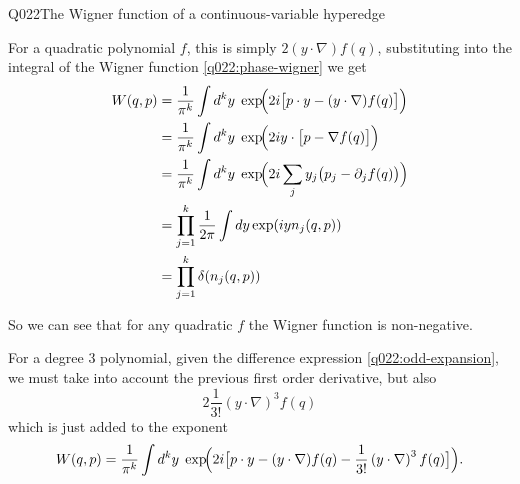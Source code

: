 \begin{entry}{Q022}{The Wigner function of a continuous-variable hyperedge}
\begin{solution}[Part (b)]
For a quadratic polynomial $f$, this is simply $2(y\cdot\nabla)f(q)$, substituting into the integral of the Wigner function \eqref{q022:phase-wigner} we get
\begin{equation}
\begin{split}
     W(q,p)&=\frac{1}{\pi^{k}}\int d^{k}y\;
          \exp\!\Bigl(2i\bigl[p\cdot y-(y\cdot\nabla)f(q)\bigr]\Bigr)\\
          &=\frac{1}{\pi^{k}}\int d^{k}y\;
          \exp\!\Bigl(2i y\cdot \bigl[p-\nabla f(q)\bigr]\Bigr)\\
          &=\frac{1}{\pi^{k}}\int d^{k}y\;
          \exp\!\Bigl(2i \sum_j y_j \bigl(p_j-\partial_j f(q)\bigr)\Bigr)\\
          &= \prod_{j=1}^{k} \frac{1}{2\pi} \int dy \exp(iy n_j(q,p))\\
          &= \prod_{j=1}^{k} \delta(n_j(q,p))
\end{split}
\label{q022:quadratic-wigner}
\end{equation}

So we can see that for any quadratic $f$ the Wigner function is non-negative.
\end{solution}

\begin{solution}[Part (c)]
For a degree $3$ polynomial, given the difference expression \eqref{q022:odd-expansion}, we must take into account the previous first order derivative, but also
\begin{equation*}
    2 \frac{1}{3!} \left(y\cdot\nabla \right)^{3}f(q)
\end{equation*}
which is just added to the exponent
\begin{equation}
     W(q,p)=\frac{1}{\pi^{k}}\int d^{k}y\;
          \exp\!\Bigl(2i\bigl[p\cdot y-(y\cdot\nabla)f(q)- \frac{1}{3!} \left(y\cdot\nabla \right)^{3}f(q) \bigr]\Bigr).
     \label{q022:cubic-wigner}
\end{equation}


\end{solution}
\end{entry}
